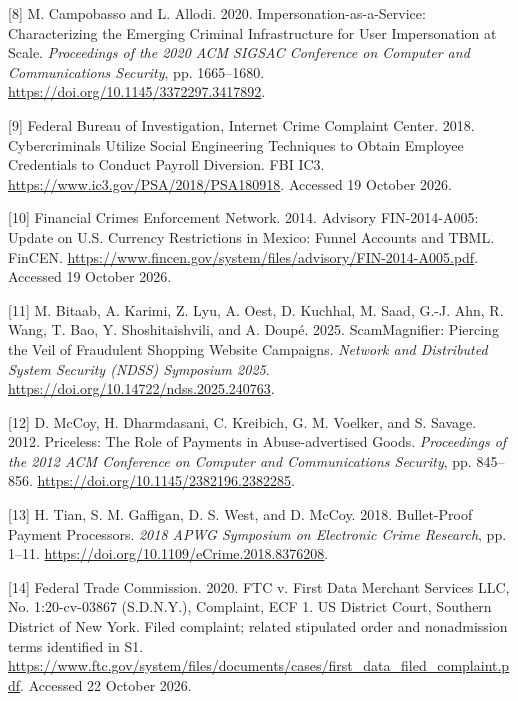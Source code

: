 \documentclass[
  11pt,
]{article}
\newlength{\cslhangindent}
\newlength{\cslentryspacingunit} %
\newenvironment{CSLReferences}[2] %
 {%
  \setlength{\parindent}{0pt}
  \ifodd #1
  \let\oldpar\par
  \def\par{\hangindent=\cslhangindent\oldpar}
  \fi
  \setlength{\parskip}{#2\cslentryspacingunit}
 }%
 {}
\begin{document}
\begin{CSLReferences}{1}{1}
\leavevmode{}%
{[}8{]} M. Campobasso and L. Allodi. 2020. Impersonation-as-a-Service:
Characterizing the Emerging Criminal Infrastructure for User
Impersonation at Scale. \emph{Proceedings of the 2020 ACM SIGSAC
Conference on Computer and Communications Security}, pp. 1665--1680.
\url{https://doi.org/10.1145/3372297.3417892}.

\leavevmode{}%
{[}9{]} Federal Bureau of Investigation, Internet Crime Complaint
Center. 2018. Cybercriminals Utilize Social Engineering Techniques to
Obtain Employee Credentials to Conduct Payroll Diversion. FBI IC3.
\url{https://www.ic3.gov/PSA/2018/PSA180918}. Accessed 19 October 2026.

\leavevmode{}%
{[}10{]} Financial Crimes Enforcement Network. 2014. Advisory
\mbox{FIN-2014}-A005: Update on U.S. Currency Restrictions in Mexico:
Funnel Accounts and TBML. FinCEN.
\url{https://www.fincen.gov/system/files/advisory/FIN-2014-A005.pdf}.
Accessed 19 October 2026.

\leavevmode{}%
{[}11{]} M. Bitaab, A. Karimi, Z. Lyu, A. Oest, D. Kuchhal, M. Saad,
G.-J. Ahn, R. Wang, T. Bao, Y. Shoshitaishvili, and A. Doupé. 2025.
ScamMagnifier: Piercing the Veil of Fraudulent Shopping Website
Campaigns. \emph{Network and Distributed System Security (NDSS)
Symposium 2025}. \url{https://doi.org/10.14722/ndss.2025.240763}.

\leavevmode{}%
{[}12{]} D. McCoy, H. Dharmdasani, C. Kreibich, G. M. Voelker, and S.
Savage. 2012. Priceless: The Role of Payments in Abuse-advertised Goods.
\emph{Proceedings of the 2012 ACM Conference on Computer and
Communications Security}, pp. 845--856.
\url{https://doi.org/10.1145/2382196.2382285}.

\leavevmode{}%
{[}13{]} H. Tian, S. M. Gaffigan, D. S. West, and D. McCoy. 2018.
Bullet-Proof Payment Processors. \emph{2018 APWG Symposium on Electronic
Crime Research}, pp. 1--11.
\url{https://doi.org/10.1109/eCrime.2018.8376208}.

\leavevmode{}%
{[}14{]} Federal Trade Commission. 2020. FTC v. First Data Merchant
Services LLC, No. 1:20-cv-03867 (S.D.N.Y.), Complaint, ECF 1. US
District Court, Southern District of New York. Filed complaint; related
stipulated order and nonadmission terms identified in S1.
\url{https://www.ftc.gov/system/files/documents/cases/first_data_filed_complaint.pdf}.
Accessed 22 October 2026.


\end{CSLReferences}
\end{document}
